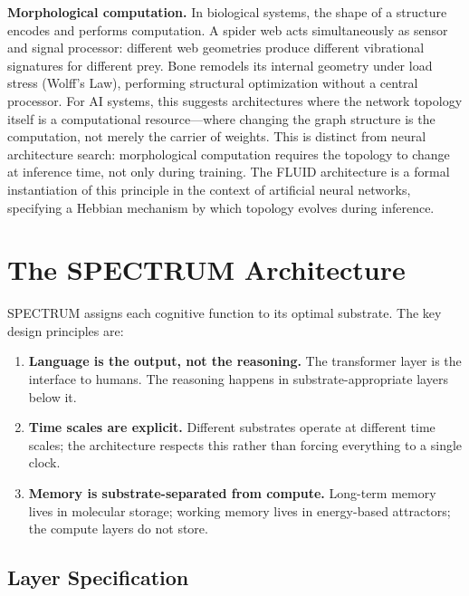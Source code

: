 \documentclass[12pt]{article}
\begin{document}
\textbf{Morphological computation.} In biological systems, the shape of a structure encodes and performs computation. A spider web acts simultaneously as sensor and signal processor: different web geometries produce different vibrational signatures for different prey. Bone remodels its internal geometry under load stress (Wolff's Law), performing structural optimization without a central processor. For AI systems, this suggests architectures where the network topology itself is a computational resource---where changing the graph structure is the computation, not merely the carrier of weights. This is distinct from neural architecture search: morphological computation requires the topology to change at inference time, not only during training. The FLUID architecture \cite{lin2026fluid} is a formal instantiation of this principle in the context of artificial neural networks, specifying a Hebbian mechanism by which topology evolves during inference.

\section{The SPECTRUM Architecture}
\label{sec:spectrum_arch}

SPECTRUM assigns each cognitive function to its optimal substrate. The key design principles are:

\begin{enumerate}
    \item \textbf{Language is the output, not the reasoning.} The transformer layer is the interface to humans. The reasoning happens in substrate-appropriate layers below it.
    \item \textbf{Time scales are explicit.} Different substrates operate at different time scales; the architecture respects this rather than forcing everything to a single clock.
    \item \textbf{Memory is substrate-separated from compute.} Long-term memory lives in molecular storage; working memory lives in energy-based attractors; the compute layers do not store.
\end{enumerate}

\subsection{Layer Specification}
\end{document}
